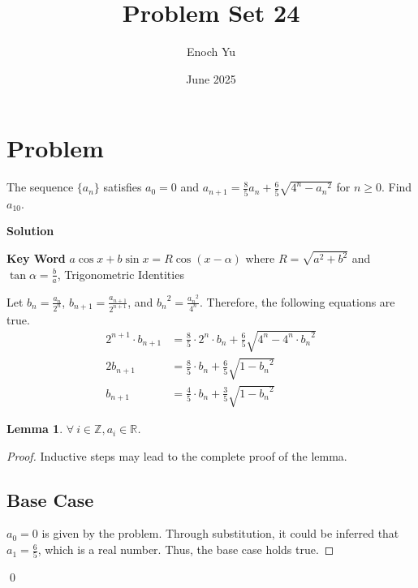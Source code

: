 \documentclass{article}
\title{Problem Set 24}
\author{Enoch Yu}
\date{June 2025}
\newtheorem*{lemma*}{Lemma}
\newenvironment{solution}{\begin{trivlist}\item[]{\bf Solution}}{\qed \end{trivlist}}
\begin{document}
\section*{Problem}
The sequence $\{ a_n \}$ satisfies $a_0 = 0$ and $a_{n + 1} = \frac{8}{5} a_n + \frac{6}{5} \sqrt{4^n - {a_n}^2}$ for $n \ge 0$. Find $a_{10}$.
\begin{solution}

\medskip

\noindent
\textbf{Key Word} $a \cos x + b \sin x = R \cos(x - \alpha)$ where $R = \sqrt{a^2 + b^2}$ and $\tan\alpha = \frac{b}{a}$, Trigonometric Identities

\medskip

\noindent
Let $b_n = \frac{a_n}{2^n}$, $b_{n + 1} = \frac{a_{n + 1}}{2^{n + 1}}$, and ${b_n}^2 = \frac{{a_n}^2}{4^n}$. Therefore, the following equations are true.
\begin{align*}
    2^{n + 1} \cdot b_{n + 1} &= \frac{8}{5} \cdot 2^n \cdot b_n +  \frac{6}{5} \sqrt{4^n - 4^n \cdot {b_n}^2} \\
    2b_{n + 1} &= \frac{8}{5} \cdot b_n +  \frac{6}{5} \sqrt{1 - {b_n}^2} \\
    b_{n + 1} &= \frac{4}{5} \cdot b_n +  \frac{3}{5} \sqrt{1 - {b_n}^2}
\end{align*}

\begin{lemma*}
    $\forall\ i \in \mathbb{Z}, a_i \in \mathbb{R}$.
\end{lemma*}
\begin{proof}
    Inductive steps may lead to the complete proof of the lemma.
    
    \subsection*{Base Case}
    $a_0 = 0$ is given by the problem. Through substitution, it could be inferred that $a_1 = \frac{6}{5}$, which is a real number. Thus, the base case holds true.


\end{proof}
\end{solution}
\end{document}
